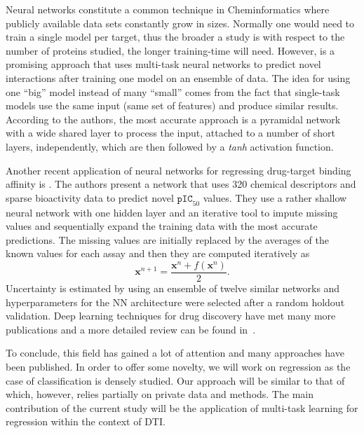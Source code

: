 \documentclass[10pt]{article}
\begin{document}
Neural networks constitute a common technique in Cheminformatics \cite{lecun2015deep,lenselink2017beyond,colwell2018statistical} where publicly available data sets constantly grow in sizes. Normally one would need to train a single model per target, thus the broader a study is with respect to the number of proteins studied, the longer training-time will need. However, \cite{ramsundar2015massively} is a promising approach that uses multi-task neural networks to predict novel interactions after training one model on an ensemble of data. The idea for using one ``big'' model instead of many ``small'' comes from the fact that single-task models use the same input (same set of features) and produce similar results. According to the authors, the most accurate approach is a pyramidal network with a wide shared layer to process the input, attached to a number of short layers, independently, which are then followed by a \textit{tanh} activation function.  

Another recent application of neural networks for regressing drug-target binding affinity is \cite{whitehead2019imputation}. The authors present a network that uses 320 chemical descriptors and sparse bioactivity data to predict novel $\texttt{pIC}_{50}$ values. They use a rather shallow neural network with one hidden layer and an iterative tool to impute missing values and sequentially expand the training data with the most accurate predictions. The missing values are initially replaced by the averages of the known values for each assay and then they are computed iteratively as 
\[ \mathbf{x}^{n+1} = \frac{\mathbf{x}^n + f(\mathbf{x}^n) }{2}. \]
Uncertainty is estimated by using an ensemble of twelve similar networks and hyperparameters for the NN architecture were selected after a random holdout validation. Deep learning techniques for drug discovery have met many more publications and a more detailed review can be found in~\cite{rifaioglu2018recent}.


To conclude, this field has gained a lot of attention and many approaches have been published. In order to offer some novelty, we will work on regression as the case of classification is densely studied. Our approach will be similar to that of \cite{martin2017profile} which, however, relies partially on private data and methods. The main contribution of the current study will be the application of multi-task learning for regression within the context of DTI. 
\end{document}
